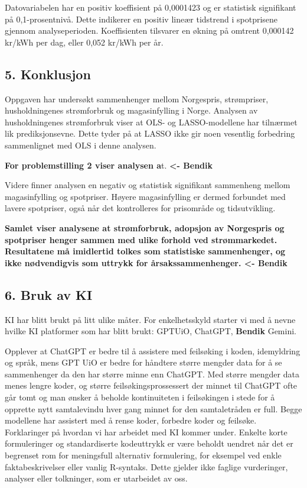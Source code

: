 \documentclass[
  letterpaper,
  DIV=11,
  numbers=noendperiod]{scrartcl}
\begin{document}
Datovariabelen har en positiv koeffisient på 0,0001423 og er statistisk
signifikant på 0,1-prosentnivå. Dette indikerer en positiv lineær
tidstrend i spotprisene gjennom analyseperioden. Koeffisienten tilsvarer
en økning på omtrent 0,000142 kr/kWh per dag, eller 0,052 kr/kWh per år.

\subsection{5. Konklusjon}\label{konklusjon}

Oppgaven har undersøkt sammenhenger mellom Norgespris, strømpriser,
husholdningenes strømforbruk og magasinfylling i Norge. Analysen av
husholdningenes strømforbruk viser at OLS- og LASSO-modellene har
tilnærmet lik prediksjonsevne. Dette tyder på at LASSO ikke gir noen
vesentlig forbedring sammenlignet med OLS i denne analysen.

\textbf{For problemstilling 2 viser analysen a}t. \textbf{\textless-
Bendik}

Videre finner analysen en negativ og statistisk signifikant sammenheng
mellom magasinfylling og spotpriser. Høyere magasinfylling er dermed
forbundet med lavere spotpriser, også når det kontrolleres for
prisområde og tidsutvikling.

\textbf{Samlet viser analysene at strømforbruk, adopsjon av Norgespris
og spotpriser henger sammen med ulike forhold ved strømmarkedet.
Resultatene må imidlertid tolkes som statistiske sammenhenger, og ikke
nødvendigvis som uttrykk for årsakssammenhenger. \textless- Bendik}

\subsection{6. Bruk av KI}\label{bruk-av-ki}

KI har blitt brukt på litt ulike måter. For enkelhetsskyld starter vi
med å nevne hvilke KI platformer som har blitt brukt: GPTUiO, ChatGPT,
\textbf{Bendik} Gemini.

Opplever at ChatGPT er bedre til å assistere med feilsøking i koden,
idemyldring og språk, mens GPT UiO er bedre for håndtere større mengder
data for å se sammenhenger da den har større minne enn ChatGPT. Med
større mengder data menes lengre koder, og større feilsøkingsprossessert
der minnet til ChatGPT ofte går tomt og man ønsker å beholde
kontinuiteten i feilsøkingen i stede for å opprette nytt samtalevindu
hver gang minnet for den samtaletråden er full. Begge modellene har
assistert med å rense koder, forbedre koder og feilsøke. Forklaringer på
hvordan vi har arbeidet med KI kommer under. Enkelte korte formuleringer
og standardiserte kodeuttrykk er være beholdt uendret når det er
begrenset rom for meningsfull alternativ formulering, for eksempel ved
enkle faktabeskrivelser eller vanlig R-syntaks. Dette gjelder ikke
faglige vurderinger, analyser eller tolkninger, som er utarbeidet av
oss.
\end{document}
